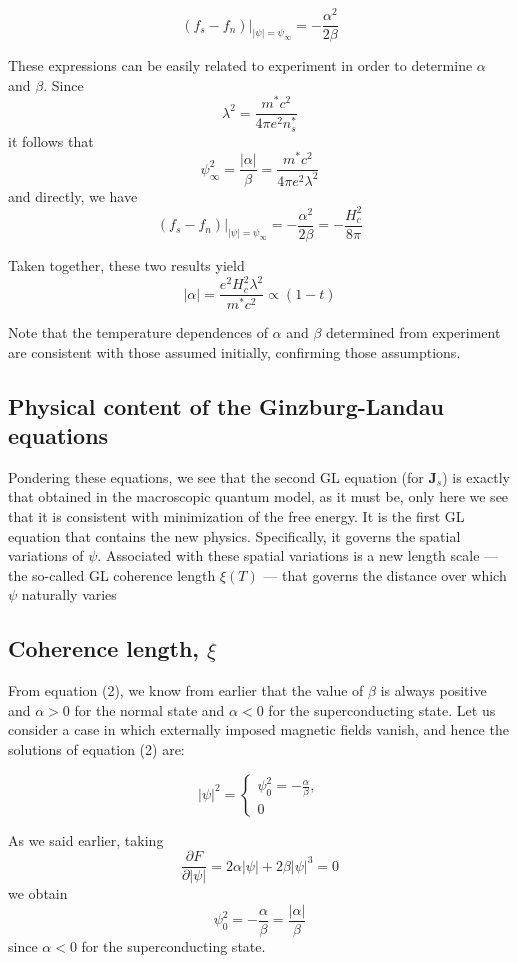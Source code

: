 \documentclass{article}
\begin{document}
\[
(f_s - f_n) \bigg|_{|\psi| = \psi_\infty} = - \frac{\alpha^2}{2\beta} \tag{34}
\]

These expressions can be easily related to experiment in order to determine $\alpha$ and $\beta$. Since
\[
\lambda^2 = \frac{m^* c^2}{4\pi e^2 n_s^*} \tag{35}
\]
it follows that
\[
\psi_\infty^2 = \frac{|\alpha|}{\beta} = \frac{m^* c^2}{4\pi e^2 \lambda^2} \tag{36}
\]
and directly, we have
\[
(f_s - f_n) \bigg|_{|\psi| = \psi_\infty} = - \frac{\alpha^2}{2\beta} = - \frac{H_c^2}{8\pi} \tag{37}
\]

Taken together, these two results yield
\[
|\alpha| = \frac{e^2 H_c^2 \lambda^2}{m^* c^2} \propto (1 - t) \tag{38}
\]

Note that the temperature dependences of $\alpha$ and $\beta$ determined from experiment are consistent with those assumed initially, confirming those assumptions.

\subsection{Physical content of the Ginzburg-Landau equations}

Pondering these equations, we see that the second GL equation (for $\mathbf{J}_s$) is exactly that obtained in the macroscopic quantum model, as it must be, only here we see that it is consistent with minimization of the free energy. It is the first GL equation that contains the new physics. Specifically, it governs the spatial variations of $\psi$. Associated with these spatial variations is a new length scale — the so-called GL coherence length $\xi(T)$ — that governs the distance over which $\psi$ naturally varies 

\subsection{Coherence length, $\xi$}

From equation (2), we know from earlier that the value of $\beta$ is always positive and $\alpha > 0$ for the normal state and $\alpha < 0$ for the superconducting state. Let us consider a case in which externally imposed magnetic fields vanish, and hence the solutions of equation (2) are:

\[
|\psi|^2 = 
\begin{cases}
    \psi_0^2 = -\frac{\alpha}{\beta}, \\
    0
\end{cases} \tag{39}
\]

As we said earlier, taking
\[
\frac{\partial F}{\partial |\psi|} = 2 \alpha |\psi| + 2 \beta |\psi|^3 = 0
\]
we obtain
\[
\psi_0^2 = - \frac{\alpha}{\beta} = \frac{|\alpha|}{\beta}
\]
since $\alpha < 0$ for the superconducting state.
\end{document}
